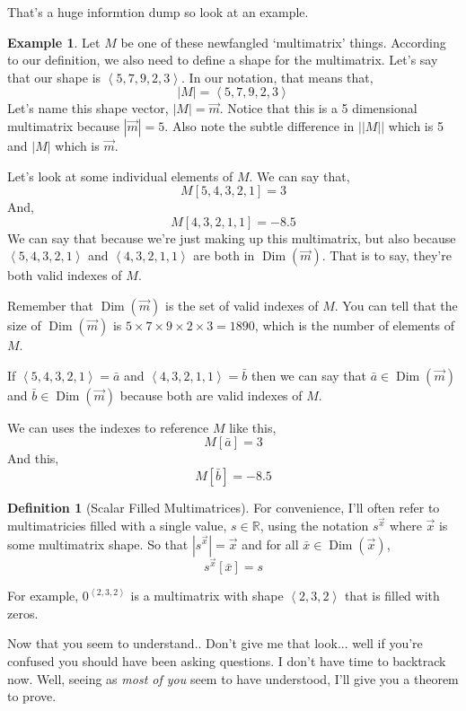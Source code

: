 \documentclass[12pt]{book}
\theoremstyle{plain}
\theoremstyle{definition}
\newtheorem{definition}{Definition}[chapter]
\newtheorem{example}{Example}[chapter]
\theoremstyle{ppart}
\theoremstyle{case}
\theoremstyle{solution}
\DeclareMathOperator{\Dim}{Dim}
\newcommand{\shape}[1]{\left|#1\right|}
\begin{document}
That's a huge informtion dump so look at an example.

\begin{example}
Let $M$ be one of these newfangled `multimatrix' things. According to our
definition, we also need to define a shape for the multimatrix. Let's
say that our shape is $\left<5,7,9,2,3\right>$. In our notation, that
means that,
\[ \shape{M} = \left<5,7,9,2,3\right> \]
Let's name this shape vector, $\shape{M} = \vec{m}$. Notice that this is
a 5 dimensional multimatrix because $\shape{\vec{m}} = 5$. Also note the
subtle difference in $\shape{\shape{M}}$ which is 5 and $\shape{M}$ which is $\vec{m}$.

Let's look at some individual elements of $M$. We can say that,
\[ M[5,4,3,2,1] = 3 \]
And,
\[ M[4,3,2,1,1] = -8.5 \]
We can say that because we're just making up this multimatrix, but also
because $\left<5,4,3,2,1\right>$ and $\left<4,3,2,1,1\right>$
are both in $\Dim(\vec{m})$. That is to say, they're both valid
indexes of $M$.

Remember that $\Dim(\vec{m})$ is the set of valid indexes of $M$.
You can tell that the size of  $\Dim(\vec{m})$ is
$5 \times 7 \times 9 \times 2 \times 3 = 1890$, which is the number of
elements of $M$.

If $\left<5,4,3,2,1\right> = \bar{a}$ and $\left<4,3,2,1,1\right> = \bar{b}$
then we can say that $\bar{a} \in \Dim(\vec{m})$ and $\bar{b} \in \Dim(\vec{m})$
because both are valid indexes of $M$.

We can uses the indexes to reference $M$ like this,
\[ M[\bar{a}] = 3 \]
And this,
\[ M[\bar{b}] = -8.5 \]
\end{example}

\begin{definition}[Scalar Filled Multimatrices]
For convenience, I'll often refer to multimatricies filled with a single value,
$s \in \mathbb{R}$,
using the notation $s^{\vec{x}}$ where $\vec{x}$ is some multimatrix shape. So that
$\shape{s^{\vec{x}}} = \vec{x}$ and for all $\bar{x} \in \Dim(\vec{x})$,
\[ s^{\vec{x}}[\bar{x}] = s \]

For example, $0^{\left<2,3,2\right>}$ is a multimatrix with shape $\left<2,3,2\right>$
that is filled with zeros.
\end{definition}

Now that you seem to understand.. Don't give me that look... well if you're confused
you should have been asking questions. I don't have time to backtrack now.
Well, seeing as \textit{most of you} seem to have understood, I'll give you a theorem to prove.
\end{document}

